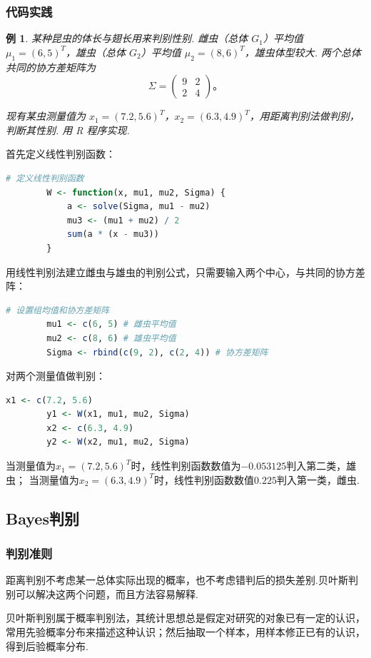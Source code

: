 \documentclass[12pt, a4paper, oneside]{ctexart}
\newtheorem{example}[theorem]{例}
\begin{document}
	\subsubsection{代码实践}
	\begin{example}
		某种昆虫的体长与翅长用来判别性别. 雌虫（总体 $G_1$）平均值 $\mu_1 = (6, 5)^T$，雄虫（总体 $G_2$）平均值 $\mu_2 = (8, 6)^T$，雄虫体型较大. 两个总体共同的协方差矩阵为
		\[
		\Sigma = \begin{pmatrix}
			9 & 2 \\
			2 & 4
		\end{pmatrix}。
		\]
		
		现有某虫测量值为 $x_{1} = (7.2, 5.6)^T$，$x_{2} = (6.3, 4.9)^{T}$，用距离判别法做判别，判断其性别. 用 R 程序实现.
	\end{example}
	首先定义线性判别函数：
	\begin{lstlisting}[language=R]
		# 定义线性判别函数
		W <- function(x, mu1, mu2, Sigma) {
			a <- solve(Sigma, mu1 - mu2) 
			mu3 <- (mu1 + mu2) / 2 
			sum(a * (x - mu3)) 
		}
	\end{lstlisting}
	用线性判别法建立雌虫与雄虫的判别公式，只需要输入两个中心，与共同的协方差阵：
	\begin{lstlisting}[language=R]
		# 设置组均值和协方差矩阵
		mu1 <- c(6, 5) # 雌虫平均值
		mu2 <- c(8, 6) # 雄虫平均值
		Sigma <- rbind(c(9, 2), c(2, 4)) # 协方差矩阵
	\end{lstlisting}
	对两个测量值做判别：
	\begin{lstlisting}[language=R]
		x1 <- c(7.2, 5.6)
		y1 <- W(x1, mu1, mu2, Sigma)
		x2 <- c(6.3, 4.9)
		y2 <- W(x2, mu1, mu2, Sigma)
	\end{lstlisting}
	当测量值为$x_{1} = (7.2, 5.6)^T$时，线性判别函数数值为$-0.053125$判入第二类，雄虫；
	当测量值为$x_{2} = (6.3, 4.9)^{T}$时，线性判别函数数值$0.225$判入第一类，雌虫.
	
	\subsection{Bayes判别}
	\subsubsection{判别准则}
	距离判别不考虑某一总体实际出现的概率，也不考虑错判后的损失差别.贝叶斯判别可以解决这两个问题，而且方法容易解释. 
	
	贝叶斯判别属于概率判别法，其统计思想总是假定对研究的对象已有一定的认识，常用先验概率分布来描述这种认识；然后抽取一个样本，用样本修正已有的认识，得到后验概率分布. 
	
\end{document}
